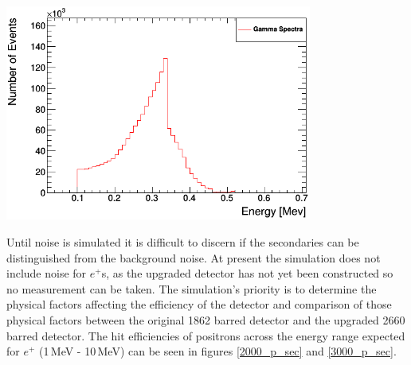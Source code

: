 \documentclass[12pt,a4paper]{article}
\newenvironment{Figure}
  {\par\medskip\noindent\minipage{\linewidth}}
  {\endminipage\par\medskip}
\begin{document}
\begin{Figure}
 \centering
 \includegraphics[height=71mm]{511centre_run_data_storage_root.png}
 \label{gamma_spectra}
\end{Figure}

Until noise is simulated it is difficult to discern if the secondaries can be distinguished from the background noise. At present the simulation does not include noise for $e^+$s, as the upgraded detector has not yet been constructed so no measurement can be taken. The simulation's priority is to determine the physical factors affecting the efficiency of the detector and comparison of those physical factors between the original 1862 barred detector and the upgraded 2660 barred detector. The hit efficiencies of positrons across the energy range expected for $e^+$ (1\,MeV - 10\,MeV) can be seen in figures \ref{2000_p_sec} and \ref{3000_p_sec}.
\end{document}
